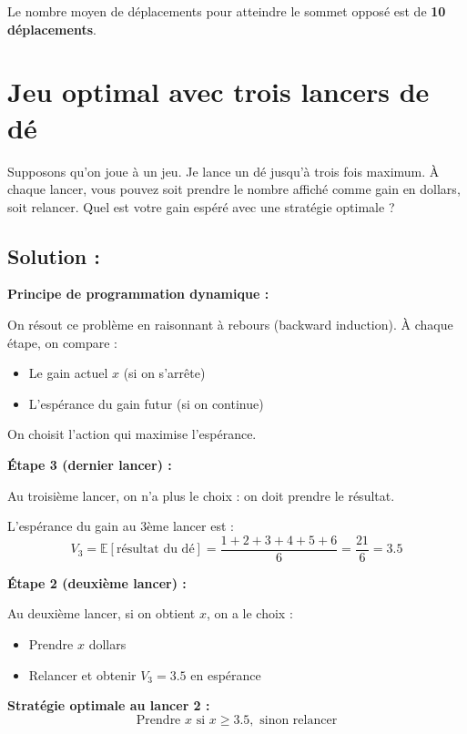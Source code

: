 Le nombre moyen de déplacements pour atteindre le sommet opposé est de \textbf{10 déplacements}.

\section{Jeu optimal avec trois lancers de dé}

\begin{exerciseBox}
Supposons qu'on joue à un jeu. Je lance un dé jusqu'à trois fois maximum. À chaque lancer, vous pouvez soit prendre le nombre affiché comme gain en dollars, soit relancer. Quel est votre gain espéré avec une stratégie optimale ?
\end{exerciseBox}

\subsection*{Solution :}

\textbf{Principe de programmation dynamique :}

On résout ce problème en raisonnant à rebours (backward induction). À chaque étape, on compare :
\begin{itemize}
    \item Le gain actuel $x$ (si on s'arrête)
    \item L'espérance du gain futur (si on continue)
\end{itemize}

On choisit l'action qui maximise l'espérance.

\textbf{Étape 3 (dernier lancer) :}

Au troisième lancer, on n'a plus le choix : on doit prendre le résultat.

L'espérance du gain au 3ème lancer est :
\[
V_3 = \mathbb{E}[\text{résultat du dé}] = \frac{1 + 2 + 3 + 4 + 5 + 6}{6} = \frac{21}{6} = 3.5
\]

\textbf{Étape 2 (deuxième lancer) :}

Au deuxième lancer, si on obtient $x$, on a le choix :
\begin{itemize}
    \item Prendre $x$ dollars
    \item Relancer et obtenir $V_3 = 3.5$ en espérance
\end{itemize}

\textbf{Stratégie optimale au lancer 2 :}
\[
\text{Prendre } x \text{ si } x \geq 3.5, \text{ sinon relancer}
\]

